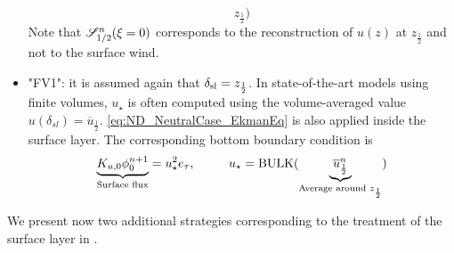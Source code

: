 \begin{itemize}
\begin{equation}
{			z_{\frac{1}{2}}})
	\end{equation}
		  Note that ${\cal S}_{1/2}^{n}(\xi=0)$ corresponds
		  to the reconstruction of $u(z)$ at
		  $z_{\frac{1}{2}}$ and not to the surface wind.
	  \item "FV1": it is assumed again that
		  $\delta_{\rm sl} = z_{\frac{1}{2}}$.
		  In state-of-the-art models using finite volumes,
		  $u_{\star}$ is often computed using the
		  volume-averaged value
		  $u(\delta_{sl}) = \overline{u}_{\frac{1}{2}}$.
		  \eqref{eq:ND_NeutralCase_EkmanEq} is
		  also applied inside the surface layer.
		The corresponding bottom boundary condition is
		  \begin{equation}
		\underbrace{K_{u,0} \phi_0^{n+1}}_{\text{Surface flux}}
		= u_\star^2 e_\tau, ~~~~~~~~
			u_\star = {\rm BULK}(
			\underbrace{\overline{u}^{n}_{\frac{1}{2}}}_{
				\text{Average around }
			z_{\frac{1}{2}}})
		  \end{equation}
\end{itemize}
We present now two additional strategies corresponding to
the treatment of the surface layer in \citep{nishizawa_surface_2018}.
